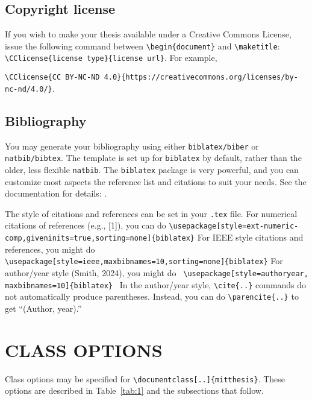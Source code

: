 \documentclass[11pt]{article}
\begin{document}
\subsection{Copyright license}
If you wish to make your thesis available under a Creative Commons License, issue the following command between
\verb|\begin{document}| and \verb|\maketitle|: \verb|\CClicense{license type}{license url}|.  For example,
 
\vskip 5pt
\noindent\quad\verb|\CClicense{CC BY-NC-ND 4.0}{https://creativecommons.org/licenses/by-nc-nd/4.0/}|.

\subsection{Bibliography}
You may generate your bibliography using either \texttt{biblatex/biber} or \texttt{natbib/bibtex}.  The template is set up for \texttt{biblatex} by default, rather than the older, less flexible \texttt{natbib}.  The \texttt{biblatex} package is very powerful, and you can customize most aspects the reference list and citations to suit your needs. See the documentation for details: .

The style of citations and references can be set in your \texttt{.tex} file. For numerical citations of references (e.g., [1]), you can do
\vskip 5pt
\verb|\usepackage[style=ext-numeric-comp,giveninits=true,sorting=none]{biblatex}|
\vskip 5pt
\noindent For IEEE style citations and references, you might do
\vskip 5pt
\verb| \usepackage[style=ieee,maxbibnames=10,sorting=none]{biblatex}|
\vskip 5pt
\noindent For author/year style (Smith, 2024), you might do
\vskip 5pt
\verb| \usepackage[style=authoryear, maxbibnames=10]{biblatex} |
\vskip 5pt
\noindent In the author/year style, \verb|\cite{..}| commands do not automatically produce parentheses. Instead, you can do
\verb|\parencite{..}| to get ``(Author, year).''

\section{CLASS OPTIONS}
Class options may be specified for \verb|\documentclass[..]{mitthesis}|. These options are described in Table~\ref{tab:1} and the subsections that follow.
\end{document}

